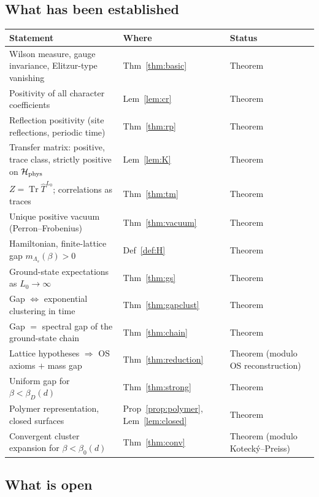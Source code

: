 \documentclass[11pt,a4paper]{article}
\theoremstyle{definition}
\theoremstyle{remark}
\DeclareMathOperator{\Tr}{Tr}
\newcommand{\cH}{\mathcal{H}}
\newcommand{\hT}{\hat{T}}
\begin{document}
\subsection{What has been established}

\begin{center}
\begin{tabular}{@{}lll@{}}
\toprule
Statement & Where & Status\\
\midrule
Wilson measure, gauge invariance, Elitzur-type vanishing & Thm~\ref{thm:basic} & Theorem\\
Positivity of all character coefficients & Lem~\ref{lem:cr} & Theorem\\
Reflection positivity (site reflections, periodic time) & Thm~\ref{thm:rp} & Theorem\\
Transfer matrix: positive, trace class, strictly positive on $\cH_{\rm phys}$ & Lem~\ref{lem:K} & Theorem\\
$Z=\Tr\hT^{L_0}$; correlations as traces & Thm~\ref{thm:tm} & Theorem\\
Unique positive vacuum (Perron--Frobenius) & Thm~\ref{thm:vacuum} & Theorem\\
Hamiltonian, finite-lattice gap $m_{\Lambda_s}(\beta)>0$ & Def~\ref{def:H} & Theorem\\
Ground-state expectations as $L_0\to\infty$ & Thm~\ref{thm:gs} & Theorem\\
Gap $\Leftrightarrow$ exponential clustering in time & Thm~\ref{thm:gapclust} & Theorem\\
Gap $=$ spectral gap of the ground-state chain & Thm~\ref{thm:chain} & Theorem\\
Lattice hypotheses $\Rightarrow$ OS axioms $+$ mass gap & Thm~\ref{thm:reduction} & Theorem (modulo OS reconstruction)\\
Uniform gap for $\beta<\beta_D(d)$ & Thm~\ref{thm:strong} & Theorem\\
Polymer representation, closed surfaces & Prop~\ref{prop:polymer}, Lem~\ref{lem:closed} & Theorem\\
Convergent cluster expansion for $\beta<\beta_0(d)$ & Thm~\ref{thm:conv} & Theorem (modulo Kotecký--Preiss)\\
\bottomrule
\end{tabular}
\end{center}

\subsection{What is open}
\end{document}
